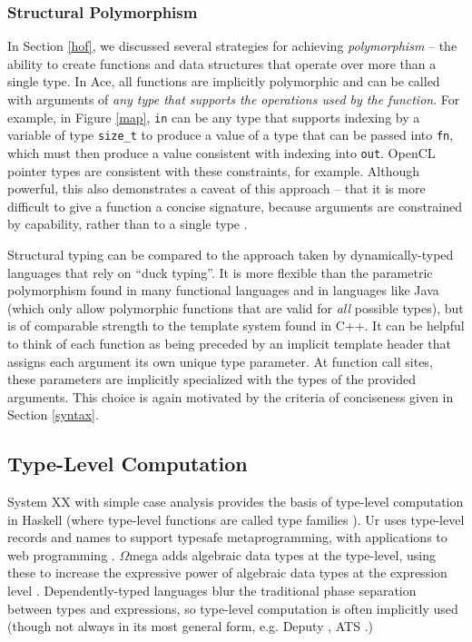 \documentclass[10pt, conference, compsocconf]{IEEEtran}
\begin{document}
\subsubsection{Structural Polymorphism}
In Section \ref{hof}, we discussed several strategies for achieving {\it polymorphism} -- the ability to create functions and data structures that operate over more than a single type. In Ace, all functions are implicitly polymorphic and can be called with arguments of {\it any type that supports the operations used by the function}. For example, in Figure \ref{map}, \verb|in| can be any type that supports indexing by a variable of type \verb|size_t| to produce a value of a type that can be passed into \verb|fn|, which must then produce a value consistent with indexing into \verb|out|. OpenCL pointer types are consistent with these constraints, for example. Although powerful, this also demonstrates a caveat of this approach -- that it is more difficult to give a function a concise signature, because arguments are constrained by capability, rather than to a single type \cite{malayeri2009structural}.

Structural typing can be compared to the approach taken by dynamically-typed languages that rely on ``duck typing''. It is more flexible than the parametric polymorphism found in many functional languages and in languages like Java (which only allow polymorphic functions that are valid for {\it all} possible types), but is of comparable strength to the template system found in C++. It can be helpful to think of each function as being preceded by an implicit template header that assigns each argument its own unique type parameter. At function call sites, these parameters are implicitly specialized with the types of the provided arguments. This choice is again motivated by the criteria of conciseness given in Section \ref{syntax}.

\subsection{Type-Level Computation} %
System XX with simple case analysis provides the basis of type-level computation in Haskell (where type-level functions are called type families \cite{Chakravarty:2005:ATC}). Ur uses type-level records and names to support typesafe metaprogramming, with applications to web programming \cite{conf/pldi/Chlipala10}. $\Omega$mega adds algebraic data types at the type-level, using these to increase the expressive power of algebraic data types at the expression level \cite{conf/cefp/SheardL07}. Dependently-typed languages blur the traditional phase separation between types and expressions, so type-level computation is often implicitly used (though not always in its most general form, e.g. Deputy \cite{conf/icfp/ChenX05}, ATS \cite{conf/esop/ConditHAGN07}.)
\end{document}
